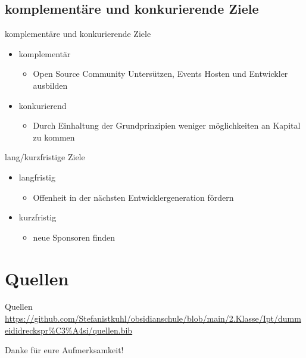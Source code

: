 \documentclass[11pt,aspectratio=169]{beamer}
\begin{document}
\subsection {komplementäre und konkurierende Ziele}
\begin{frame}{komplementäre und konkurierende Ziele}
	\begin{itemize}
		\item komplementär
		      \begin{itemize}
			      \item Open Source Community Untersützen, Events Hosten und Entwickler ausbilden
		      \end{itemize}
	\end{itemize}
	\begin{itemize}
		\item konkurierend
		      \begin{itemize}
			      \item Durch Einhaltung der Grundprinzipien weniger möglichkeiten an Kapital zu kommen
		      \end{itemize}
	\end{itemize}
\end{frame}
\begin{frame}{lang/kurzfristige Ziele}
	\begin{itemize}
		\item langfristig
		      \begin{itemize}
			      \item Offenheit in der nächsten Entwicklergeneration fördern
		      \end{itemize}
	\end{itemize}
	\begin{itemize}
		\item kurzfristig
		      \begin{itemize}
			      \item neue Sponsoren finden
		      \end{itemize}
	\end{itemize}
\end{frame}

\section{Quellen}
\begin{frame}{Quellen}
	\centering
	\url{https://github.com/Stefanistkuhl/obsidianschule/blob/main/2.Klasse/Ipt/dummeididreckspr\%C3\%A4si/quellen.bib}
	
	
\end{frame}
\begin{frame}{Danke für eure Aufmerksamkeit!}
\end{frame}
\end{document}
